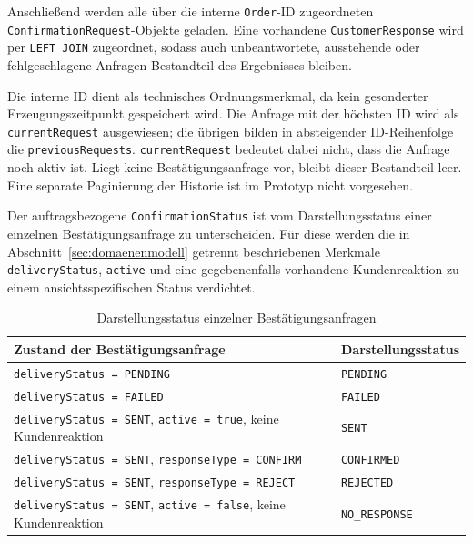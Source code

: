 Anschließend werden alle über die interne \texttt{Order}-ID zugeordneten
\texttt{ConfirmationRequest}-Objekte geladen. Eine vorhandene
\texttt{CustomerResponse} wird per \texttt{LEFT JOIN} zugeordnet, sodass auch
unbeantwortete, ausstehende oder fehlgeschlagene Anfragen Bestandteil des
Ergebnisses bleiben.

Die interne ID dient als technisches Ordnungsmerkmal, da kein gesonderter
Erzeugungszeitpunkt gespeichert wird. Die Anfrage mit der höchsten ID wird als
\texttt{currentRequest} ausgewiesen; die übrigen bilden in absteigender
ID-Reihenfolge die \texttt{previousRequests}. \texttt{currentRequest} bedeutet
dabei nicht, dass die Anfrage noch aktiv ist. Liegt keine
Bestätigungsanfrage vor, bleibt dieser Bestandteil leer. Eine separate
Paginierung der Historie ist im Prototyp nicht vorgesehen.

Der auftragsbezogene \texttt{ConfirmationStatus} ist vom Darstellungsstatus
einer einzelnen Bestätigungsanfrage zu unterscheiden. Für diese werden die
in Abschnitt~\ref{sec:domaenenmodell} getrennt beschriebenen Merkmale
\texttt{deliveryStatus}, \texttt{active} und eine gegebenenfalls vorhandene
Kundenreaktion zu einem ansichtsspezifischen Status verdichtet.

\begin{table}[htbp]
  \centering
  \small
  \renewcommand{\arraystretch}{1.15}
  \caption{Darstellungsstatus einzelner Bestätigungsanfragen}
  \label{tab:anfrage-darstellungsstatus}
  \begin{tabularx}{\textwidth}{@{}
    >{\raggedright\arraybackslash}X
    >{\raggedright\arraybackslash}p{}@{}}
    \toprule
    \textbf{Zustand der Bestätigungsanfrage}
      & \textbf{Darstellungsstatus} \\
    \midrule
    \texttt{deliveryStatus = PENDING}
      & \texttt{PENDING} \\
    \texttt{deliveryStatus = FAILED}
      & \texttt{FAILED} \\
    \texttt{deliveryStatus = SENT}, \texttt{active = true}, keine
      Kundenreaktion
      & \texttt{SENT} \\
    \texttt{deliveryStatus = SENT}, \texttt{responseType = CONFIRM}
      & \texttt{CONFIRMED} \\
    \texttt{deliveryStatus = SENT}, \texttt{responseType = REJECT}
      & \texttt{REJECTED} \\
    \texttt{deliveryStatus = SENT}, \texttt{active = false}, keine
      Kundenreaktion
      & \texttt{NO\_RESPONSE} \\
    \bottomrule
  \end{tabularx}
\end{table}

